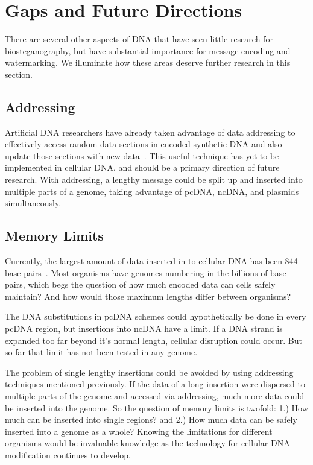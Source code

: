 \documentclass{bioinfo}
\begin{document}
\section{Gaps and Future Directions}

There are several other aspects of DNA that have seen little research for biosteganography, but have substantial importance for message encoding and watermarking. We illuminate how these areas deserve further research in this section.

\subsection{Addressing}

Artificial DNA researchers have already taken advantage of data addressing to effectively access random data sections in encoded synthetic DNA and also update those sections with new data~\cite{SG2016BRI}. This useful technique has yet to be implemented in cellular DNA, and should be a primary direction of future research. With addressing, a lengthy message could be split up and inserted into multiple parts of a genome, taking advantage of pcDNA, ncDNA, and plasmids simultaneously.

\subsection{Memory Limits}

Currently, the largest amount of data inserted in to cellular DNA has been 844 base pairs~\cite{AR2009BT}. Most organisms have genomes numbering in the billions of base pairs, which begs the question of how much encoded data can cells safely maintain? And how would those maximum lengths differ between organisms?

The DNA substitutions in pcDNA schemes could hypothetically be done in every pcDNA region, but insertions into ncDNA have a limit. If a DNA strand is expanded too far beyond it's normal length, cellular disruption could occur. But so far that limit has not been tested in any genome.

The problem of single lengthy insertions could be avoided by using addressing techniques mentioned previously. If the data of a long insertion were dispersed to multiple parts of the genome and accessed via addressing, much more data could be inserted into the genome. So the question of memory limits is twofold: 1.) How much can be inserted into single regions? and 2.) How much data can be safely inserted into a genome as a whole? Knowing the limitations for different organisms would be invaluable knowledge as the technology for cellular DNA modification continues to develop.
\end{document}
